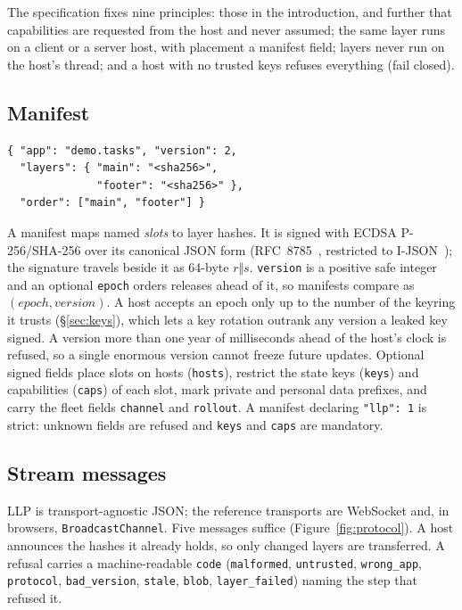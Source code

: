 \documentclass[10pt,twocolumn]{article}
\newcommand{\code}[1]{\texttt{#1}}
\begin{document}
The specification fixes nine principles: those in the introduction, and further that capabilities are
requested from the host and never assumed; the same layer runs on a client or a server host, with
placement a manifest field; layers never run on the host's thread; and a host with no trusted keys
refuses everything (fail closed).

\subsection{Manifest}

\begin{lstlisting}
{ "app": "demo.tasks", "version": 2,
  "layers": { "main": "<sha256>",
              "footer": "<sha256>" },
  "order": ["main", "footer"] }
\end{lstlisting}

A manifest maps named \emph{slots} to layer hashes. It is signed with ECDSA P-256/SHA-256 over
its canonical JSON form (RFC~8785~\cite{rfc8785}, restricted to I-JSON~\cite{rfc7493}); the
signature travels beside it as 64-byte $r\Vert s$. \code{version} is a positive safe integer and
an optional \code{epoch} orders releases ahead of it, so manifests compare as
$(\mathit{epoch},\mathit{version})$. A host accepts an epoch only up to the number of the keyring
it trusts (\S\ref{sec:keys}), which lets a key rotation outrank any version a leaked key signed.
A version more than one year of milliseconds ahead of the host's clock is refused, so a single
enormous version cannot freeze future updates. Optional signed fields place slots on hosts
(\code{hosts}), restrict the state keys (\code{keys}) and capabilities (\code{caps}) of each slot,
mark private and personal data prefixes, and carry the fleet fields \code{channel} and
\code{rollout}. A manifest declaring \code{"llp": 1} is strict: unknown fields are refused and
\code{keys} and \code{caps} are mandatory.

\subsection{Stream messages}

LLP is transport-agnostic JSON; the reference transports are WebSocket and, in browsers,
\code{BroadcastChannel}. Five messages suffice (Figure~\ref{fig:protocol}). A host announces the
hashes it already holds, so only changed layers are transferred. A refusal carries a
machine-readable \code{code} (\code{malformed}, \code{untrusted}, \code{wrong\_app},
\code{protocol}, \code{bad\_version}, \code{stale}, \code{blob}, \code{layer\_failed}) naming the
step that refused it.
\end{document}
